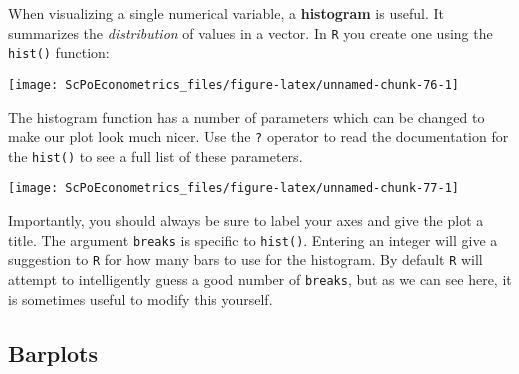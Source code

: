 \documentclass[]{book}
\newenvironment{Shaded}{\begin{snugshade}}{\end{snugshade}}
\newcommand{\KeywordTok}[1]{\textcolor[rgb]{0.13,0.29,0.53}{\textbf{#1}}}
\newcommand{\DataTypeTok}[1]{\textcolor[rgb]{0.13,0.29,0.53}{#1}}
\newcommand{\DecValTok}[1]{\textcolor[rgb]{0.00,0.00,0.81}{#1}}
\newcommand{\StringTok}[1]{\textcolor[rgb]{0.31,0.60,0.02}{#1}}
\newcommand{\CommentTok}[1]{\textcolor[rgb]{0.56,0.35,0.01}{\textit{#1}}}
\newcommand{\OperatorTok}[1]{\textcolor[rgb]{0.81,0.36,0.00}{\textbf{#1}}}
\newcommand{\NormalTok}[1]{#1}
\begin{document}
When visualizing a single numerical variable, a \textbf{histogram} is
useful. It summarizes the \emph{distribution} of values in a vector. In
\texttt{R} you create one using the \texttt{hist()} function:

\begin{Shaded}
\end{Shaded}

\begin{center}\texttt{[image: ScPoEconometrics\_files/figure-latex/unnamed-chunk-76-1]} \end{center}

The histogram function has a number of parameters which can be changed
to make our plot look much nicer. Use the \texttt{?} operator to read
the documentation for the \texttt{hist()} to see a full list of these
parameters.

\begin{Shaded}
\end{Shaded}

\begin{center}\texttt{[image: ScPoEconometrics\_files/figure-latex/unnamed-chunk-77-1]} \end{center}

Importantly, you should always be sure to label your axes and give the
plot a title. The argument \texttt{breaks} is specific to
\texttt{hist()}. Entering an integer will give a suggestion to
\texttt{R} for how many bars to use for the histogram. By default
\texttt{R} will attempt to intelligently guess a good number of
\texttt{breaks}, but as we can see here, it is sometimes useful to
modify this yourself.

\subsection{Barplots}\label{barplots}
\end{document}
